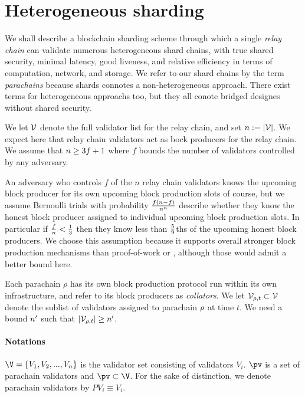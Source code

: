 \section{Heterogeneous sharding}

We shall describe a blockchain sharding scheme through which a single {\em relay chain} can validate numerous heterogeneous shard chains, with true shared security, minimal latency, good liveness, and relative efficiency in terms of computation, network, and storage.  We refer to our shard chains by the term {\em parachains} because shards connotes a non-heterogeneous approach.  There exist terms for heterogeneous approachs too, but they all conote bridged designes without shared security.  

We let $\mathcal{V}$ denote the full validator list for the relay chain, and set $n := |\mathcal{V}|$.  We expect here that relay chain validators act as bock producers for the relay chain.  We assume that $n \ge 3 f + 1$ where $f$ bounds the number of validators controlled by any adversary.

An adversary who controls $f$ of the $n$ relay chain validators knows the upcoming block producer for its own upcoming block production slots of course, but we assume Bernoulli trials with probability ${f (n-f) \over n^n}$ describe whether they know the honest block producer assigned to individual upcoming block production slots.  In particular if ${f \over n} < {1\over3}$ then they know less than ${5 \over 9}$ths of the upcoming honest block producers.
We choose this assumption because it supports overall stronger block production mechanisms than proof-of-work or \cite{Praos}, although those would admit a better bound here.

Each parachain $\rho$ has its own block production protocol run within its own infrastructure, and refer to its block producers as {\em collators}.  We let $\mathcal{V}_{\rho,t} \subset \mathcal{V}$ denote the sublist of validators assigned to parachain $\rho$ at time $t$.  We need a bound $n'$ such that $|\mathcal{V}_{\rho,t}| \ge n'$.






\paragraph{Notations} $\V= \{V_1,V_2,...,V_n\}$ is the validator set consisting of validators $V_i$. $\pv$ is a set of parachain validators and $\pv \subset \V$. For the sake of distinction, we denote parachain validators by $PV_i \equiv V_i$.

